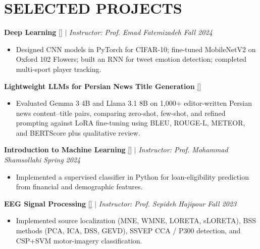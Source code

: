 \documentclass[11pt,a4paper,roman]{moderncv}        %
\begin{document}
    \section{SELECTED PROJECTS}

    \textbf{Deep Learning} \href{https://github.com/RadinKhayyam/Deep_Learning_Course}{\textcolor{blue link}{[\faGithub]}} $|$ \emph{Instructor: Prof. Emad Fatemizadeh} \hfill{\emph{Fall 2024}} 
    \vspace{2mm}
    \begin{itemize} 
    \item Designed CNN models in PyTorch for CIFAR-10; fine-tuned MobileNetV2 on Oxford 102 Flowers; built an RNN for tweet emotion detection; completed multi-sport player tracking.
    \end{itemize}

    \vspace{2mm}
    \textbf{Lightweight LLMs for Persian News Title Generation} \href{https://github.com/RadinKhayyam/Persian-News-Title-Generation}{\textcolor{blue link}{[\faGithub]}}
    \vspace{2mm}
    \begin{itemize} \item Evaluated Gemma 3 4B and Llama 3.1 8B on 1,000+ editor-written Persian news content--title pairs, comparing zero-shot, few-shot, and refined prompting against LoRA fine-tuning using BLEU, ROUGE-L, METEOR, and BERTScore plus qualitative review. \end{itemize}

    \vspace{2mm}
    \textbf{Introduction to Machine Learning} \href{https://github.com/RadinKhayyam/Introduction_to_Machine_Learning_Course}{\textcolor{blue link}{[\faGithub]}} $|$ \emph{Instructor: Prof. Mohammad Shamsollahi} \hfill{\emph{Spring 2024}} 
    \vspace{2mm}
    \begin{itemize} \item Implemented a supervised classifier in Python for loan-eligibility prediction from financial and demographic features. \end{itemize}

    \vspace{2mm}
    \textbf{EEG Signal Processing} \href{https://github.com/RadinKhayyam/EEG_Signal_Processing_Course}{\textcolor{blue link}{[\faGithub]}} $|$ \emph{Instructor: Prof. Sepideh Hajipour} \hfill{\emph{Fall 2023}} 
    \vspace{2mm}
    \begin{itemize} \item Implemented source localization (MNE, WMNE, LORETA, sLORETA), BSS methods (PCA, ICA, DSS, GEVD), SSVEP CCA / P300 detection, and CSP+SVM motor-imagery classification. \end{itemize}
\end{document}
